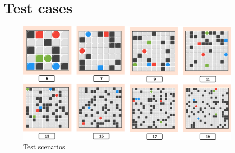 \chapter{Test cases}
\label{sec:app_04}

\begin{figure}[H]
    \centering
    \includegraphics[width=\textwidth]{pictures/test_cases.png}
    \caption{ Test scenarios }
    \label{fig:test_cases}
\end{figure}